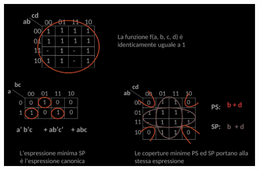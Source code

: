 \documentclass{article}
\begin{document}
\begin{center}
    \includegraphics[scale=0.55]{escoper2.png}
\end{center}
\end{document}
